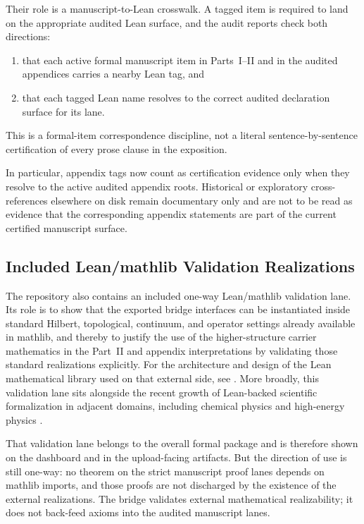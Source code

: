 Their role is a manuscript-to-Lean crosswalk. A tagged item is required to
land on the appropriate audited Lean surface, and the audit reports check both
directions:
\begin{enumerate}[label=(\roman*), itemsep=0.2em]
\item that each active formal manuscript item in Parts~I--II and in the audited appendices carries a nearby Lean tag, and
\item that each tagged Lean name resolves to the correct audited declaration
surface for its lane.
\end{enumerate}
This is a formal-item correspondence discipline, not a literal
sentence-by-sentence certification of every prose clause in the exposition.

In particular, appendix tags now count as certification evidence only when they
resolve to the active audited appendix roots. Historical or exploratory
cross-references elsewhere on disk remain documentary only and are not to be
read as evidence that the corresponding appendix statements are part of the
current certified manuscript surface.

\subsection{Included Lean/mathlib Validation Realizations}
\label{subsec:formal-mathlib-bridge}

The repository also contains an included one-way Lean/mathlib validation lane.
Its role is to show that the exported bridge interfaces can be instantiated
inside standard Hilbert, topological, continuum, and operator settings already
available in mathlib, and thereby to justify the use of the higher-structure
carrier mathematics in the Part~II and appendix interpretations by validating
those standard realizations explicitly. For the architecture and design of the
Lean mathematical library used on that external side, see
\cite{mathlibCommunity2020}. More broadly, this validation lane sits alongside
the recent growth of Lean-backed scientific formalization in adjacent domains,
including chemical physics and high-energy physics
\cite{BobbinEtAl2024,ToobySmith2025}.

That validation lane belongs to the overall formal package and is therefore
shown on the dashboard and in the upload-facing artifacts. But the direction
of use is still one-way: no theorem on the strict manuscript proof lanes
depends on mathlib imports, and those proofs are not discharged by the
existence of the external realizations. The bridge validates external
mathematical realizability; it does not back-feed axioms into the audited
manuscript lanes.

